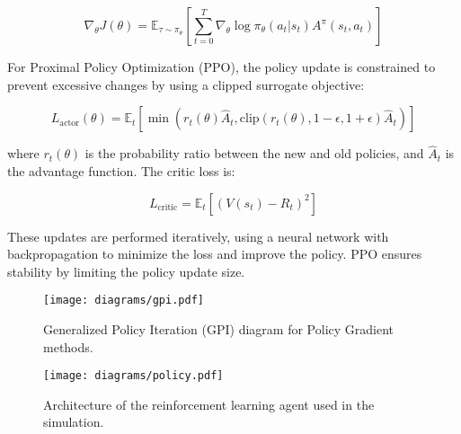\documentclass[11pt]{article}
\begin{document}
    \[
        \nabla_\theta J(\theta) = \mathbb{E}_{\tau \sim \pi_\theta} \left[ \sum_{t=0}^{T} \nabla_\theta \log \pi_\theta(a_t | s_t) A^\pi(s_t, a_t) \right]
    \]

    For Proximal Policy Optimization (PPO), the policy update is constrained to prevent excessive changes by using a clipped surrogate objective:

    \[
        L_{\text{actor}}(\theta) = \mathbb{E}_t \left[ \min \left( r_t(\theta) \hat{A}_t, \text{clip}(r_t(\theta), 1-\epsilon, 1+\epsilon) \hat{A}_t \right) \right]
    \]

    where \( r_t(\theta) \) is the probability ratio between the new and old policies, and \( \hat{A}_t \) is the advantage function.
    The critic loss is:

    \[
        L_{\text{critic}} = \mathbb{E}_t \left[ (V(s_t) - R_t)^2 \right]
    \]

    These updates are performed iteratively, using a neural network with backpropagation to minimize the loss and improve the policy.
    PPO ensures stability by limiting the policy update size.

    \begin{figure}[htb]
        \centering
        \texttt{[image: diagrams/gpi.pdf]}
        \caption{Generalized Policy Iteration (GPI) diagram for Policy Gradient methods.}
        \label{fig:gpi}
    \end{figure}

    \begin{figure}[htb]
        \centering
        \texttt{[image: diagrams/policy.pdf]}
        \caption{Architecture of the reinforcement learning agent used in the simulation.}
        \label{fig:agent}
    \end{figure}
\end{document}
